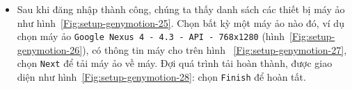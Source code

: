 \documentclass[13pt,a4paper]{extreport}
\begin{document}
\begin{itemize}
\begin{itemize}
					\item Sau khi đăng nhập thành công, chúng ta thấy danh sách các thiết bị máy ảo như hình~\ref{Fig:setup-genymotion-25}. Chọn bất kỳ một máy ảo nào đó, ví dụ chọn máy ảo \verb|Google Nexus 4 - 4.3 - API - 768x1280| (hình~\ref{Fig:setup-genymotion-26}), có thông tin máy cho trên hình ~\ref{Fig:setup-genymotion-27}, chọn \verb|Next| để tải máy ảo về máy. Đợi quá trình tải hoàn thành, được giao diện như hình~\ref{Fig:setup-genymotion-28}: chọn \verb|Finish| để hoàn tất.
						\begin{figure}[!h]
							\begin{center}	
									\hspace{.5cm}
								\\

\end{center}
\end{figure}
\end{itemize}
\end{itemize}
\end{document}
